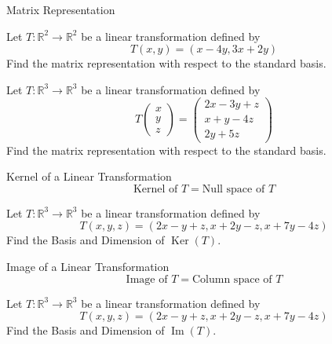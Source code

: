 \documentclass[11pt]{beamer}
\theoremstyle{plain}
\begin{document}
\begin{frame}{Matrix Representation}
    \begin{example}
        Let $T:\mathbb R^2\rightarrow\mathbb R^2$ be a linear transformation defined by
        $$T(x,y)=(x-4y,3x+2y)$$
        Find the matrix representation with respect to the standard basis. 
    \end{example}
    \begin{example}
        Let $T:\mathbb R^3\rightarrow\mathbb R^3$ be a linear transformation defined by
        $$T\begin{pmatrix}
            x\\y\\z
        \end{pmatrix}=\begin{pmatrix}
            2x-3y+z\\x+y-4z\\2y+5z
        \end{pmatrix}$$
        Find the matrix representation with respect to the standard basis. 
    \end{example}
\end{frame}

\begin{frame}{Kernel of a Linear Transformation}
    $$\text{Kernel of }T=\text{Null space of }T$$
    \begin{example}
        Let $T:\mathbb R^3\rightarrow\mathbb R^3$ be a linear transformation defined by $$T(x,y,z)=(2x-y+z,x+2y-z,x+7y-4z)$$
        Find the Basis and Dimension of $\operatorname{Ker}(T)$. 
    \end{example}
\end{frame}

\begin{frame}{Image of a Linear Transformation}
    $$\text{Image of }T=\text{Column space of }T$$
    \begin{example}
        Let $T:\mathbb R^3\rightarrow\mathbb R^3$ be a linear transformation defined by $$T(x,y,z)=(2x-y+z,x+2y-z,x+7y-4z)$$
        Find the Basis and Dimension of $\operatorname{Im}(T)$. 
    \end{example}
\end{frame}
\end{document}
